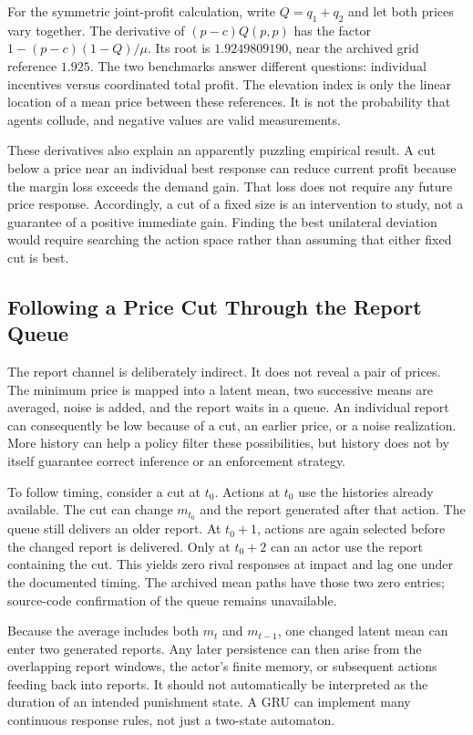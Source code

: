 \documentclass{article}
\begin{document}
For the symmetric joint-profit calculation, write $Q=q_1+q_2$ and let both prices vary together. The derivative of $(p-c)Q(p,p)$ has the factor $1-(p-c)(1-Q)/\mu$. Its root is $1.9249809190$, near the archived grid reference $1.925$. The two benchmarks answer different questions: individual incentives versus coordinated total profit. The elevation index is only the linear location of a mean price between these references. It is not the probability that agents collude, and negative values are valid measurements.

These derivatives also explain an apparently puzzling empirical result. A cut below a price near an individual best response can reduce current profit because the margin loss exceeds the demand gain. That loss does not require any future price response. Accordingly, a cut of a fixed size is an intervention to study, not a guarantee of a positive immediate gain. Finding the best unilateral deviation would require searching the action space rather than assuming that either fixed cut is best.

\subsection{Following a Price Cut Through the Report Queue}

The report channel is deliberately indirect. It does not reveal a pair of prices. The minimum price is mapped into a latent mean, two successive means are averaged, noise is added, and the report waits in a queue. An individual report can consequently be low because of a cut, an earlier price, or a noise realization. More history can help a policy filter these possibilities, but history does not by itself guarantee correct inference or an enforcement strategy.

To follow timing, consider a cut at $t_0$. Actions at $t_0$ use the histories already available. The cut can change $m_{t_0}$ and the report generated after that action. The queue still delivers an older report. At $t_0+1$, actions are again selected before the changed report is delivered. Only at $t_0+2$ can an actor use the report containing the cut. This yields zero rival responses at impact and lag one under the documented timing. The archived mean paths have those two zero entries; source-code confirmation of the queue remains unavailable.

Because the average includes both $m_t$ and $m_{t-1}$, one changed latent mean can enter two generated reports. Any later persistence can then arise from the overlapping report windows, the actor's finite memory, or subsequent actions feeding back into reports. It should not automatically be interpreted as the duration of an intended punishment state. A GRU can implement many continuous response rules, not just a two-state automaton.
\end{document}
